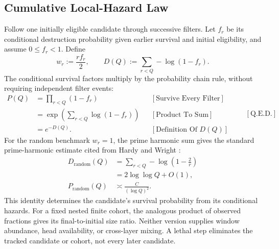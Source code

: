 \subsection{Cumulative Local-Hazard Law}
Follow one initially eligible candidate through successive filters. Let $f_r$ be its conditional destruction probability given earlier survival and initial eligibility, and assume $0\le f_r < 1$. Define
\begin{equation*}
w_r:=\frac{rf_r}{2},
\qquad
D(Q):=\sum_{r < Q}-\log(1-f_r).
\end{equation*}
The conditional survival factors multiply by the probability chain rule, without requiring independent filter events:
\begin{equation*}
\begin{aligned}
P(Q)
&=\prod_{r < Q}(1-f_r)
&&[\text{Survive Every Filter}]\\
&=\exp\left(\sum_{r < Q}\log(1-f_r)\right)
&&[\text{Product To Sum}]\\
&=e^{-D(Q)}.
&&[\text{Definition Of }D(Q)]
\end{aligned}
\qquad[\text{Q.E.D.}]
\end{equation*}
For the random benchmark $w_r=1$, the prime harmonic sum gives the
standard prime-harmonic estimate cited from Hardy and Wright
\cite{hardywright2008}:
\begin{equation*}
\begin{aligned}
D_{\mathrm{random}}(Q)
&=\sum_{r < Q}-\log\left(1-\frac2r\right)\\
&=2\log\log Q+O(1),\\
P_{\mathrm{random}}(Q)
&\asymp\frac{C}{(\log Q)^2}.
\end{aligned}
\end{equation*}
This identity determines the candidate's survival probability from its conditional hazards. For a fixed nested finite cohort, the analogous product of observed fractions gives its final-to-initial size ratio. Neither version supplies window abundance, head availability, or cross-layer mixing. A lethal step eliminates the tracked candidate or cohort, not every later candidate.
